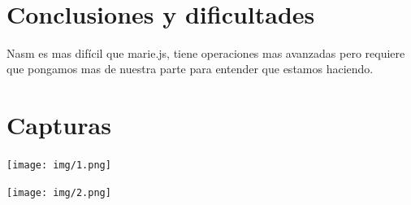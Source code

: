 \documentclass[12pt]{article}
\begin{document}
\\ 

\pagebreak

\section*{Conclusiones y dificultades}
\label{sec:orga20a190}
Nasm es mas difícil que marie.js, tiene operaciones mas avanzadas pero requiere que pongamos mas de nuestra parte para entender que estamos haciendo.

\section*{Capturas}
\label{sec:org1037ed7}
\begin{center}
\texttt{[image: img/1.png]}
\end{center}

\begin{center}
\texttt{[image: img/2.png]}
\end{center}
\end{document}
